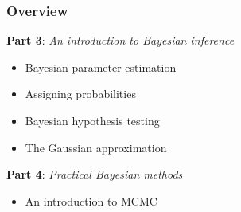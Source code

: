 \begin{frame}

\frametitle{Overview}
\label{overview}

\textbf{Part 3}: \emph{An introduction to Bayesian inference}

\begin{itemize}
\item Bayesian parameter estimation

\item Assigning probabilities

\item Bayesian hypothesis testing

\item The Gaussian approximation

\end{itemize}

\textbf{Part 4}: \emph{Practical Bayesian methods}

\begin{itemize}
\item An introduction to MCMC

\end{itemize}

\end{frame}

